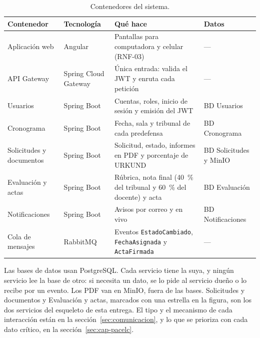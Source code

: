 \begin{table}[htbp]
  \centering
  \caption{Contenedores del sistema.}
  \label{tab:contenedores}
  \small
  \begin{tabularx}{\textwidth}{@{}>{\raggedright\arraybackslash}p{2.9cm} >{\raggedright\arraybackslash}p{2.6cm} >{\raggedright\arraybackslash}X >{\raggedright\arraybackslash}p{2.6cm}@{}}
    \toprule
    \textbf{Contenedor} & \textbf{Tecnología} & \textbf{Qué hace} & \textbf{Datos} \\
    \midrule
    Aplicación web & Angular & Pantallas para computadora y celular (RNF-03) & --- \\
    API Gateway & Spring Cloud Gateway & Única entrada: valida el JWT y enruta cada petición & --- \\
    Usuarios & Spring Boot & Cuentas, roles, inicio de sesión y emisión del JWT & BD Usuarios \\
    Cronograma & Spring Boot & Fecha, sala y tribunal de cada predefensa & BD Cronograma \\
    Solicitudes y documentos & Spring Boot & Solicitud, estado, informes en PDF y porcentaje de URKUND & BD Solicitudes y MinIO \\
    Evaluación y actas & Spring Boot & Rúbrica, nota final (40~\% del tribunal y 60~\% del docente) y acta & BD Evaluación \\
    Notificaciones & Spring Boot & Avisos por correo y en vivo & BD Notificaciones \\
    Cola de mensajes & RabbitMQ & Eventos \texttt{EstadoCambiado}, \texttt{FechaAsignada} y \texttt{ActaFirmada} & --- \\
    \bottomrule
  \end{tabularx}
\end{table}

Las bases de datos usan PostgreSQL. Cada servicio tiene la suya, y ningún servicio lee la base de otro: si necesita un dato, se lo pide al servicio dueño o lo recibe por un evento. Los PDF van en MinIO, fuera de las bases. Solicitudes y documentos y Evaluación y actas, marcados con una estrella en la figura, son los dos servicios del esqueleto de esta entrega. El tipo y el mecanismo de cada interacción están en la sección~\ref{sec:comunicacion}, y lo que se prioriza con cada dato crítico, en la sección~\ref{sec:cap-pacelc}.
